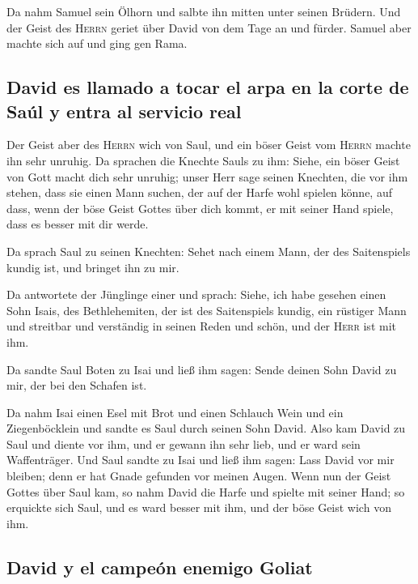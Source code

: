  Da nahm Samuel sein Ölhorn und salbte ihn mitten unter
seinen Brüdern. Und der Geist des \textsc{Herrn} geriet über David von
dem Tage an und fürder. Samuel aber machte sich auf und ging gen Rama.

\hypertarget{david-es-llamado-a-tocar-el-arpa-en-la-corte-de-sauxfal-y-entra-al-servicio-real}{%
\subsection{David es llamado a tocar el arpa en la corte de Saúl y entra
al servicio
real}\label{david-es-llamado-a-tocar-el-arpa-en-la-corte-de-sauxfal-y-entra-al-servicio-real}}

 Der Geist aber des \textsc{Herrn} wich von Saul, und ein
böser Geist vom \textsc{Herrn} machte ihn sehr unruhig. 
Da sprachen die Knechte Sauls zu ihm: Siehe, ein böser Geist von Gott
macht dich sehr unruhig;  unser Herr sage seinen
Knechten, die vor ihm stehen, dass sie einen Mann suchen, der auf der
Harfe wohl spielen könne, auf dass, wenn der böse Geist Gottes über dich
kommt, er mit seiner Hand spiele, dass es besser mit dir werde.

 Da sprach Saul zu seinen Knechten: Sehet nach einem
Mann, der des Saitenspiels kundig ist, und bringet ihn zu mir.

 Da antwortete der Jünglinge einer und sprach: Siehe, ich
habe gesehen einen Sohn Isais, des Bethlehemiten, der ist des
Saitenspiels kundig, ein rüstiger Mann und streitbar und verständig in
seinen Reden und schön, und der \textsc{Herr} ist mit ihm.

 Da sandte Saul Boten zu Isai und ließ ihm sagen: Sende
deinen Sohn David zu mir, der bei den Schafen ist.

 Da nahm Isai einen Esel mit Brot und einen Schlauch Wein
und ein Ziegenböcklein und sandte es Saul durch seinen Sohn David.
 Also kam David zu Saul und diente vor ihm, und er gewann
ihn sehr lieb, und er ward sein Waffenträger.  Und Saul
sandte zu Isai und ließ ihm sagen: Lass David vor mir bleiben; denn er
hat Gnade gefunden vor meinen Augen.  Wenn nun der Geist
Gottes über Saul kam, so nahm David die Harfe und spielte mit seiner
Hand; so erquickte sich Saul, und es ward besser mit ihm, und der böse
Geist wich von ihm.

\hypertarget{david-y-el-campeuxf3n-enemigo-goliat}{%
\subsection{David y el campeón enemigo
Goliat}\label{david-y-el-campeuxf3n-enemigo-goliat}}

